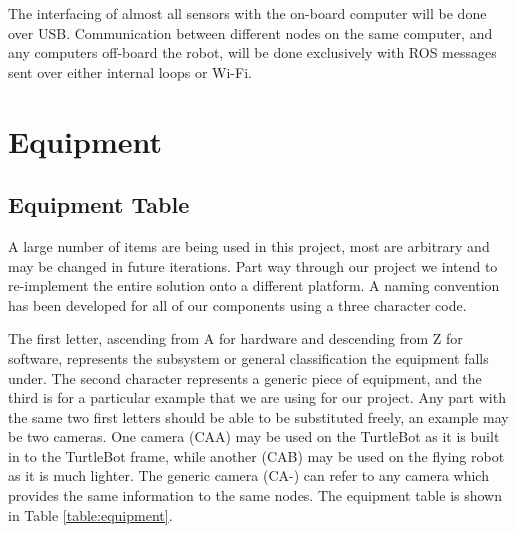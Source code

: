 \documentclass{article}[12]
\begin{document}
	The interfacing of almost all sensors with the on-board computer will be done over USB. Communication between different nodes on the same computer, and any computers off-board the robot, will be done exclusively with ROS messages sent over either internal loops or Wi-Fi.

\section{Equipment}

	\subsection{Equipment Table}
	
	A large number of items are being used in this project, most are arbitrary and may be changed in future iterations. Part way through our project we intend to re-implement the entire solution onto a different platform. A naming convention has been developed for all of our components using a three character code.
	
	The first letter, ascending from A for hardware and descending from Z for software, represents the subsystem or general classification the equipment falls under. The second character represents a generic piece of equipment, and the third is for a particular example that we are using for our project. Any part with the same two first letters should be able to be substituted freely, an example may be two cameras. One camera (CAA) may be used on the TurtleBot as it is built in to the TurtleBot frame, while another (CAB) may be used on the flying robot as it is much lighter. The generic camera (CA-) can refer to any camera which provides the same information to the same nodes. The equipment table is shown in Table \ref{table:equipment}.
	
\end{document}
